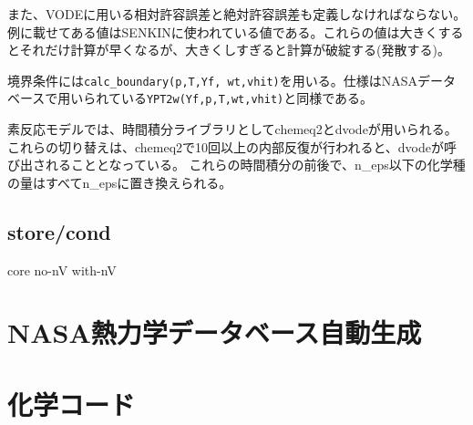 \documentclass{jsarticle}
\begin{document}
また、VODEに用いる相対許容誤差と絶対許容誤差も定義しなければならない。例に載せてある値はSENKINに使われている値である。これらの値は大きくするとそれだけ計算が早くなるが、大きくしすぎると計算が破綻する(発散する)。

境界条件には\verb|calc_boundary(p,T,Yf, wt,vhit)|を用いる。仕様はNASAデータベースで用いられている\verb|YPT2w(Yf,p,T,wt,vhit)|と同様である。

素反応モデルでは、時間積分ライブラリとしてchemeq2とdvodeが用いられる。
これらの切り替えは、chemeq2で10回以上の内部反復が行われると、dvodeが呼び出されることとなっている。
これらの時間積分の前後で、n\_eps以下の化学種の量はすべてn\_epsに置き換えられる。

\subsection{store/cond}%
core
no-nV
with-nV


\section{NASA熱力学データベース自動生成}
\section{化学コード}

%
%
%
\end{document}
